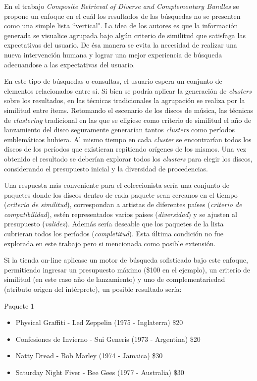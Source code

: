 En el trabajo {\em Composite Retrieval of Diverse and Complementary Bundles} \cite{journals/tkde/Amer-YahiaBCFMZ14} se propone un enfoque en el cuál los resultados de las búsquedas no se presenten como una simple lista ``vertical". La idea de los autores es que la información generada se visualice agrupada bajo algún criterio de similitud que satisfaga las expectativas del usuario. De ésa manera se evita la necesidad de realizar una nueva intervención humana y lograr una mejor experiencia de búsqueda adecuandose a las expectativas del usuario.

En este tipo de búsquedas o consultas, el usuario espera un conjunto de elementos relacionados entre sí. Si bien se podría aplicar la generación de {\em clusters} sobre los resultados, en las técnicas tradicionales la agrupación se realiza por la similitud entre ítems. Retomando el escenario de los discos de música, las técnicas de {\em clustering} tradicional en las que se eligiese como criterio de similitud el año de lanzamiento del disco seguramente generarían tantos {\em clusters} como períodos emblemáticos hubiera. Al mismo tiempo en cada {\em cluster} se encontrarían todos los discos de los períodos que existieran repitiendo orígenes de los mismos. Una vez obtenido el resultado se deberían explorar todos los {\em clusters} para elegir los discos, considerando el presupuesto inicial y la diversidad de procedencias.

Una respuesta más conveniente para el coleccionista sería una conjunto de paquetes donde los discos dentro de cada paquete sean cercanos en el tiempo ({\em criterio de similitud}), correspondan a artistas de diferentes países ({\em criterio de compatibilidad}), estén representados varios países ({\em diversidad}) y se ajusten al presupuesto ({\em validez}). Además sería deseable que los paquetes de la lista cubrieran todos los períodos ({\em completitud}). Esta última condición no fue explorada en este trabajo pero si mencionada como posible extensión.

Si la tienda on-line aplicase un motor de búsqueda sofisticado bajo este enfoque, permitiendo ingresar un presupuesto máximo (\$100 en el ejemplo), un criterio de similitud (en este caso año de lanzamiento) y uno de complementariedad (atributo origen del intérprete), un posible resultado sería:

\begin{mybox}{Paquete 1}
	\begin{itemize}
		\item {\scriptsize Physical Graffiti - Led Zeppelin (1975 - Inglaterra) \$20}
		\item {\scriptsize Confesiones de Invierno - Sui Generis (1973 - Argentina) \$20}
		\item {\scriptsize Natty Dread - Bob Marley (1974 - Jamaica) \$30}
		\item {\scriptsize Saturday Night Fiver - Bee Gees (1977 - Australia) \$30}
	\end{itemize}
\end{mybox}

